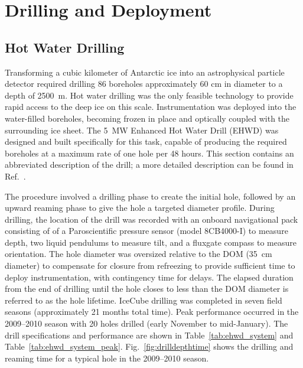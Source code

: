 
\section{\label{sec:drill-deploy}Drilling and Deployment}

\subsection{\label{sec:hot_water_drilling}Hot Water Drilling}

Transforming a cubic kilometer of Antarctic ice into an astrophysical
particle detector required drilling 86 boreholes
approximately 60 cm in diameter to a depth of 2500~m. Hot water drilling
was the only
feasible technology to provide rapid access to the deep ice on this scale.
Instrumentation was deployed into the water-filled boreholes, becoming
frozen in place and optically
coupled with the surrounding ice sheet. The 5~MW Enhanced Hot Water Drill
(EHWD) was designed and built specifically for this task,
capable of producing the required boreholes at a maximum rate of one hole per 48
hours. This section contains an abbreviated description of the drill; a more detailed description
can be found in Ref.~\cite{ehwd}.

The procedure involved a drilling phase to create the initial hole,
followed by an upward reaming phase to give the 
hole a targeted diameter profile.  During drilling, the location of
the drill was recorded with an onboard navigational pack consisting of
of a Paroscientific pressure sensor
(model 8CB4000-I) to measure depth, two
liquid pendulums to measure tilt, and a fluxgate compass to measure
orientation. The hole diameter was oversized relative to 
the DOM (35~cm diameter) to compensate for closure from refreezing to provide sufficient
time to deploy instrumentation, with contingency time for delays.  The
elapsed duration from the end of drilling until the hole closes to
less than the DOM diameter is referred to as the hole lifetime. IceCube drilling was
completed in seven field seasons (approximately 21 months total time).
Peak performance occurred in the 2009--2010 season with 20 holes drilled
(early November to mid-January).  The drill specifications and performance
are shown in Table~\ref{tab:ehwd_system} and
Table~\ref{tab:ehwd_system_peak}. Fig.~\ref{fig:drilldepthtime} shows the
drilling and reaming time for a typical hole in the 2009--2010 season.

